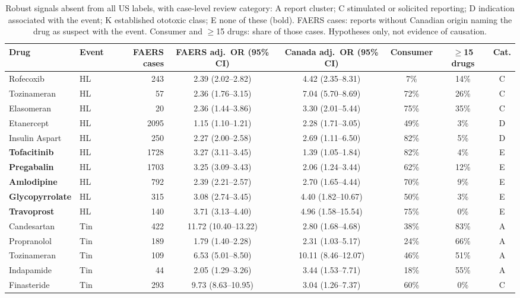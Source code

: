 \documentclass[11pt]{article}
\begin{document}
\begin{table}[t]
\centering\small
\caption{Robust signals absent from all US labels, with case-level review category: A report cluster; C stimulated or
solicited reporting; D indication associated with the event; K established ototoxic class; E none of these (bold). FAERS
cases: reports without Canadian origin naming the drug as suspect with the event. Consumer and $\geq$15 drugs: share of those
cases. Hypotheses only, not evidence of causation.}
\label{tab:cand}
\begin{tabular}{llrccccc}
\toprule
Drug & Event & FAERS cases & FAERS adj.\ OR (95\% CI) & Canada adj.\ OR (95\% CI) & Consumer & $\geq$15 drugs & Cat. \\
\midrule
Rofecoxib & HL & 243 & 2.39 (2.02--2.82) & 4.42 (2.35--8.31) & 7\% & 14\% & C \\
Tozinameran & HL & 57 & 2.36 (1.76--3.15) & 7.04 (5.70--8.69) & 72\% & 26\% & C \\
Elasomeran & HL & 20 & 2.36 (1.44--3.86) & 3.30 (2.01--5.44) & 75\% & 35\% & C \\
Etanercept & HL & 2095 & 1.15 (1.10--1.21) & 2.28 (1.71--3.05) & 49\% & 3\% & D \\
Insulin Aspart & HL & 250 & 2.27 (2.00--2.58) & 2.69 (1.11--6.50) & 82\% & 5\% & D \\
\textbf{Tofacitinib} & HL & 1728 & 3.27 (3.11--3.45) & 1.39 (1.05--1.84) & 82\% & 4\% & E \\
\textbf{Pregabalin} & HL & 1703 & 3.25 (3.09--3.43) & 2.06 (1.24--3.44) & 62\% & 12\% & E \\
\textbf{Amlodipine} & HL & 792 & 2.39 (2.21--2.57) & 2.70 (1.65--4.44) & 70\% & 9\% & E \\
\textbf{Glycopyrrolate} & HL & 315 & 3.08 (2.74--3.45) & 4.40 (1.82--10.67) & 50\% & 3\% & E \\
\textbf{Travoprost} & HL & 140 & 3.71 (3.13--4.40) & 4.96 (1.58--15.54) & 75\% & 0\% & E \\
Candesartan & Tin & 422 & 11.72 (10.40--13.22) & 2.80 (1.68--4.68) & 38\% & 83\% & A \\
Propranolol & Tin & 189 & 1.79 (1.40--2.28) & 2.31 (1.03--5.17) & 24\% & 66\% & A \\
Tozinameran & Tin & 109 & 6.53 (5.01--8.50) & 10.11 (8.46--12.07) & 46\% & 51\% & A \\
Indapamide & Tin & 44 & 2.05 (1.29--3.26) & 3.44 (1.53--7.71) & 18\% & 55\% & A \\
Finasteride & Tin & 293 & 9.73 (8.63--10.95) & 3.04 (1.26--7.37) & 60\% & 0\% & C \\

\end{tabular}
\end{table}
\end{document}
